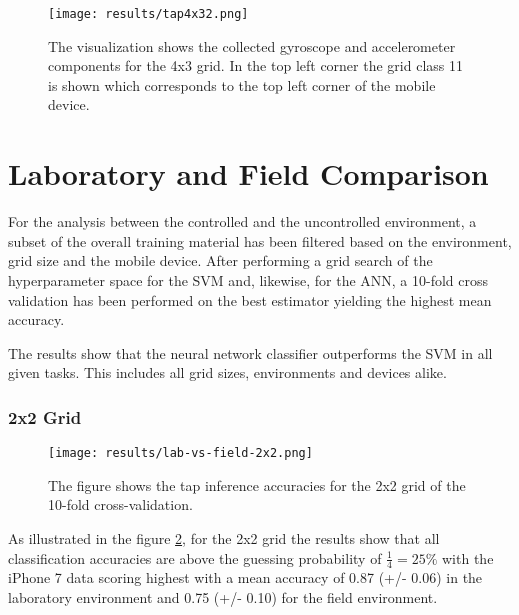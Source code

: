 \begin{figure}[h!]
  \centering
  \texttt{[image: results/tap4x32.png]}
  \caption{The visualization shows the collected gyroscope and accelerometer components for the 4x3 grid. In the top left corner the grid class 11 is shown which corresponds to the top left corner of the mobile device.} \label{fig:taps}
\end{figure}


\section{Laboratory and Field Comparison}
For the analysis between the controlled and the uncontrolled environment, a subset of the overall training material has been filtered based on the environment, grid size and the mobile device. After performing a grid search of the hyperparameter space for the SVM and, likewise, for the ANN, a 10-fold cross validation has been performed on the best estimator yielding the highest mean accuracy.

The results show that the neural network classifier outperforms the SVM in all given tasks. This includes all grid sizes, environments and devices alike.

\subsubsection{2x2 Grid}

\begin{figure}[h!]
  \centering
  \texttt{[image: results/lab-vs-field-2x2.png]}
  \caption{The figure shows the tap inference accuracies for the 2x2 grid of the 10-fold cross-validation.} \label{fig:lab2x2}
\end{figure}

As illustrated in the figure \ref{fig:lab2x2}, for the 2x2 grid the results show that all classification accuracies are above the guessing probability of $\frac{1}{4} = 25\%$ with the iPhone 7 data scoring highest with a mean accuracy of 0.87 (+/- 0.06) in the laboratory environment and 0.75 (+/- 0.10) for the field environment.

